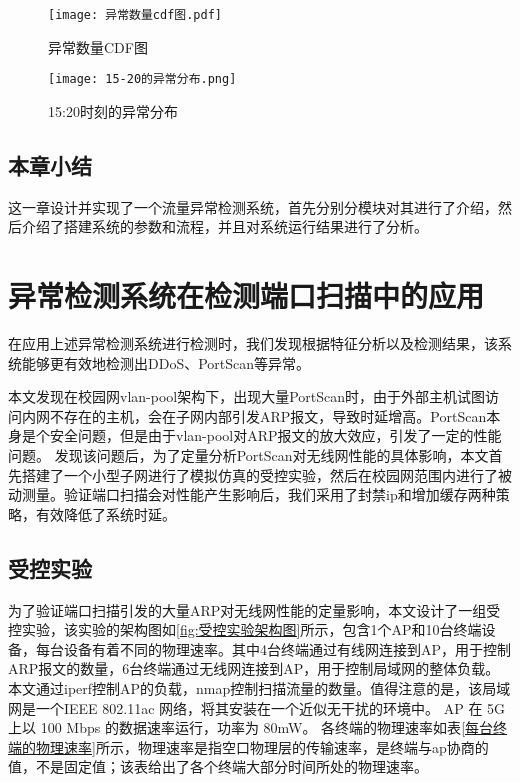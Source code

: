 \begin{figure}[htbp]
  \centering
  \begin{minipage}[t]{0.48\textwidth}
  \centering
  \texttt{[image: 异常数量cdf图.pdf]}
  \caption{异常数量CDF图}
  \end{minipage}
  \begin{minipage}[t]{0.48\textwidth}
  \centering
  \texttt{[image: 15-20的异常分布.png]}
  \caption{15:20时刻的异常分布}
  \end{minipage}
  \end{figure}



\section{本章小结}
这一章设计并实现了一个流量异常检测系统，首先分别分模块对其进行了介绍，然后介绍了搭建系统的参数和流程，并且对系统运行结果进行了分析。

\chapter{异常检测系统在检测端口扫描中的应用}
在应用上述异常检测系统进行检测时，我们发现根据特征分析以及检测结果，该系统能够更有效地检测出DDoS、PortScan等异常。

本文发现在校园网vlan-pool架构下，出现大量PortScan时，由于外部主机试图访问内网不存在的主机，会在子网内部引发ARP报文，导致时延增高。PortScan本身是个安全问题，但是由于vlan-pool对ARP报文的放大效应，引发了一定的性能问题。
发现该问题后，为了定量分析PortScan对无线网性能的具体影响，本文首先搭建了一个小型子网进行了模拟仿真的受控实验，然后在校园网范围内进行了被动测量。验证端口扫描会对性能产生影响后，我们采用了封禁ip和增加缓存两种策略，有效降低了系统时延。

\section{受控实验}
为了验证端口扫描引发的大量ARP对无线网性能的定量影响，本文设计了一组受控实验，该实验的架构图如\ref{fig:受控实验架构图}所示，包含1个AP和10台终端设备，每台设备有着不同的物理速率。其中4台终端通过有线网连接到AP，用于控制ARP报文的数量，6台终端通过无线网连接到AP，用于控制局域网的整体负载。本文通过iperf控制AP的负载，nmap控制扫描流量的数量。值得注意的是，该局域网是一个IEEE 802.11ac 网络，将其安装在一个近似无干扰的环境中。 AP 在 5G 上以 100 Mbps 的数据速率运行，功率为 80mW。 各终端的物理速率如表\ref{每台终端的物理速率}所示，物理速率是指空口物理层的传输速率，是终端与ap协商的值，不是固定值；该表给出了各个终端大部分时间所处的物理速率。

